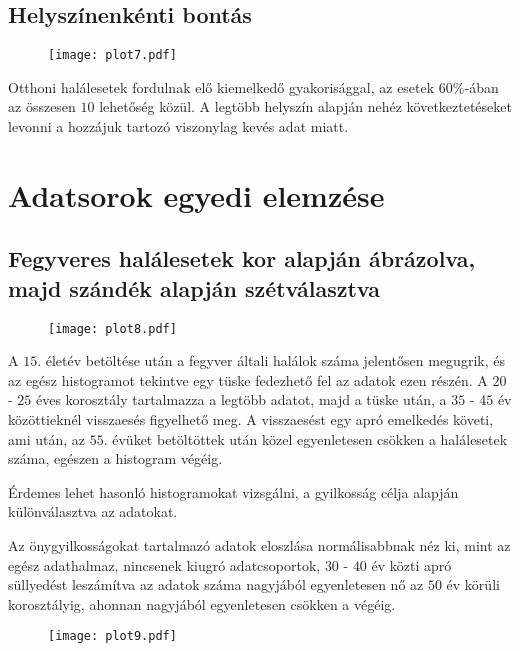 \documentclass{article}
\begin{document}
\subsection{Helyszínenkénti bontás}

\begin{minipage}{0.5\textwidth}
\begin{figure}[H]
\texttt{[image: plot7.pdf]}
\end{figure}
\end{minipage} \hfill
\begin{minipage}{0.45\textwidth}
Otthoni halálesetek fordulnak elő kiemelkedő gyakorisággal, az esetek $60\%$-ában az összesen $10$ lehetőség közül. A legtöbb helyszín alapján nehéz következtetéseket levonni a hozzájuk tartozó viszonylag kevés adat miatt.
\end{minipage}

\section{Adatsorok egyedi elemzése}

\subsection{Fegyveres halálesetek kor alapján ábrázolva, majd szándék alapján szétválasztva}

\begin{figure}[h]
\centering
\texttt{[image: plot8.pdf]}
\end{figure}

A $15.$ életév betöltése után a fegyver általi halálok száma jelentősen megugrik, és az egész histogramot tekintve egy tüske fedezhető fel az adatok ezen részén. A $20$ - $25$ éves korosztály tartalmazza a legtöbb adatot, majd a tüske után, a $35$ - $45$ év közöttieknél visszaesés figyelhető meg. A visszaesést egy apró emelkedés követi, ami után, az $55.$ évüket betöltöttek után közel egyenletesen csökken a halálesetek száma, egészen a histogram végéig. \par
Érdemes lehet hasonló histogramokat vizsgálni, a gyilkosság célja alapján különválasztva az adatokat.

\begin{minipage}{0.45\textwidth}
Az önygyilkosságokat tartalmazó adatok eloszlása normálisabbnak néz ki, mint az egész adathalmaz, nincsenek kiugró adatcsoportok, $30$ - $40$ év közti apró süllyedést leszámítva az adatok száma nagyjából egyenletesen nő az $50$ év körüli korosztályig, ahonnan nagyjából egyenletesen csökken a végéig.
\end{minipage}
\begin{minipage}{0.5\textwidth}
\begin{figure}[H]
\texttt{[image: plot9.pdf]}
\end{figure}
\end{minipage} \hfill
\end{document}
